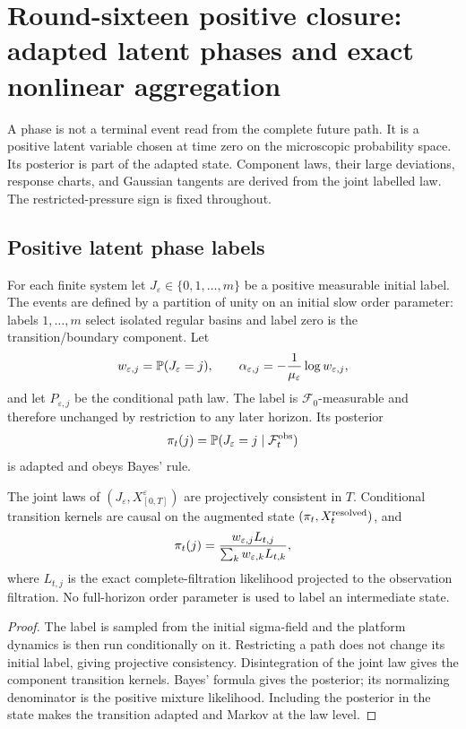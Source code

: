 \section{Round-sixteen positive closure: adapted latent phases and exact nonlinear aggregation}
\label{sec:r16-d1}

A phase is not a terminal event read from the complete future path.  It is a
positive latent variable chosen at time zero on the microscopic probability
space.  Its posterior is part of the adapted state.  Component laws, their
large deviations, response charts, and Gaussian tangents are derived from the
joint labelled law.  The restricted-pressure sign is fixed throughout.

\subsection{Positive latent phase labels}

For each finite system let \(J_\varepsilon\in\{0,1,\ldots,m\}\) be a positive
measurable initial label.  The events are defined by a partition of unity on an
initial slow order parameter: labels \(1,\ldots,m\) select isolated regular
basins and label zero is the transition/boundary component.  Let
\[
 w_{\varepsilon,j}=\mathbb P(J_\varepsilon=j),
 \qquad
 \alpha_{\varepsilon,j}=-{1\over\mu_\varepsilon}
 \log w_{\varepsilon,j},
\]
and let \(P_{\varepsilon,j}\) be the conditional path law.  The label is
\(\mathcal F_0\)-measurable and therefore unchanged by restriction to any
later horizon.  Its posterior
\[
 \pi_t(j)=\mathbb P(J_\varepsilon=j\mid\mathcal F_t^{\rm obs})
\]
is adapted and obeys Bayes' rule.

\begin{theorem}
\label{thm:r16-d1-phase}
The joint laws of \((J_\varepsilon,X^\varepsilon_{[0,T]})\) are projectively
consistent in \(T\).  Conditional transition kernels are causal on the
augmented state \((\pi_t,X_t^{\rm resolved})\), and
\[
 \pi_t(j)={w_{\varepsilon,j}L_{t,j}
 \over\sum_k w_{\varepsilon,k}L_{t,k}},
\]
where \(L_{t,j}\) is the exact complete-filtration likelihood projected to the
observation filtration.  No full-horizon order parameter is used to label an
intermediate state.
\end{theorem}

\begin{proof}
The label is sampled from the initial sigma-field and the platform dynamics is
then run conditionally on it.  Restricting a path does not change its initial
label, giving projective consistency.  Disintegration of the joint law gives
the component transition kernels.  Bayes' formula gives the posterior; its
normalizing denominator is the positive mixture likelihood.  Including the
posterior in the state makes the transition adapted and Markov at the law
level.
\end{proof}

